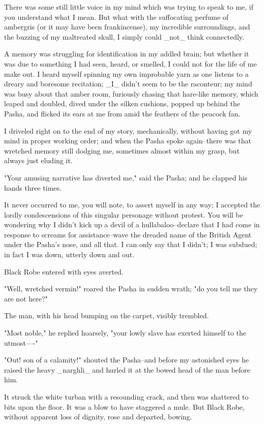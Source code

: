 There was some still little voice in my mind which was trying to speak
to me, if you understand what I mean. But what with the suffocating
perfume of ambergris (or it may have been frankincense), my incredible
surroundings, and the buzzing of my maltreated skull, I simply could
_not_ think connectedly.

A memory was struggling for identification in my addled brain; but
whether it was due to something I had seen, heard, or smelled, I could
not for the life of me make out. I heard myself spinning my own
improbable yarn as one listens to a dreary and boresome recitation;
_I_ didn't seem to be the raconteur; my mind was busy about that amber
room, furiously chasing that hare-like memory, which leaped and
doubled, dived under the silken cushions, popped up behind the Pasha,
and flicked its ears at me from amid the feathers of the peacock fan.

I driveled right on to the end of my story, mechanically, without
having got my mind in proper working order; and when the Pasha spoke
again--there was that wretched memory still dodging me, sometimes
almost within my grasp, but always just eluding it.

"Your amusing narrative has diverted me," said the Pasha; and he
clapped his hands three times.

It never occurred to me, you will note, to assert myself in any way; I
accepted the lordly condescensions of this singular personage without
protest. You will be wondering why I didn't kick up a devil of a
hullabaloo--declare that I had come in response to screams for
assistance--wave the dreaded name of the British Agent under the
Pasha's nose, and all that. I can only say that I didn't; I was
subdued; in fact I was down, utterly down and out.

Black Robe entered with eyes averted.

"Well, wretched vermin!" roared the Pasha in sudden wrath; "do you
tell me they are not here?"

The man, with his head bumping on the carpet, visibly trembled.

"Most noble," he replied hoarsely, "your lowly slave has exerted
himself to the utmost----"

"Out! son of a calamity!" shouted the Pasha--and before my astonished
eyes he raised the heavy _narghli_ and hurled it at the bowed head of
the man before him.

It struck the white turban with a resounding crack, and then was
shattered to bits upon the floor. It was a blow to have staggered a
mule. But Black Robe, without apparent loss of dignity, rose and
departed, bowing.

